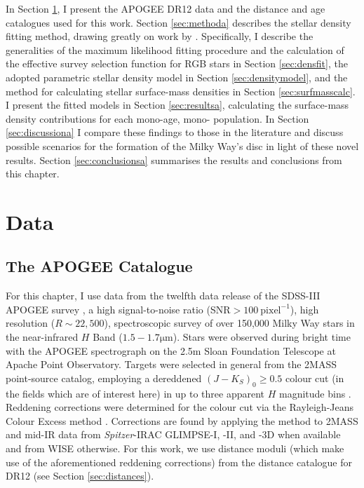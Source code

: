  In Section \ref{sec:dataa}, I present the APOGEE DR12 data and the distance and age catalogues used for this work. Section \ref{sec:methoda} describes the stellar density fitting method, drawing greatly on work by \citet{2016ApJ...818..130B,2016ApJ...823...30B}. Specifically, I describe the generalities of the maximum likelihood fitting procedure and the calculation of the effective survey selection function for RGB stars in Section \ref{sec:densfit}, the adopted parametric stellar density model in Section \ref{sec:densitymodel}, and the method for calculating stellar surface-mass densities in Section \ref{sec:surfmasscalc}. I present the fitted models in Section \ref{sec:resultsa}, calculating the surface-mass density contributions for each mono-age, mono-\feh{} population. In Section \ref{sec:discussiona} I compare these findings to those in the literature and discuss possible scenarios for the formation of the Milky Way's disc in light of these novel results. Section \ref{sec:conclusionsa} summarises the results and conclusions from this chapter. 


 \section{Data}

\label{sec:dataa}
 \subsection{The APOGEE Catalogue}
 \label{sec:APOGEE}
For this chapter, I use data from the twelfth data release \citep[DR12,][]{2015ApJS..219...12A} of the SDSS-III APOGEE survey \citep[][]{2015arXiv150905420M}, a high signal-to-noise ratio (SNR$>100\ \mathrm{pixel}^{-1}$), high resolution ($R \sim 22,500$), spectroscopic survey of over 150,000 Milky Way stars in the near-infrared $H$ Band ($1.5 - 1.7 \mathrm{\mu m}$). Stars were observed during bright time with the APOGEE spectrograph \citep{2010SPIE.7735E..1CW} on the 2.5m Sloan Foundation Telescope \citep{2006AJ....131.2332G} at Apache Point Observatory. Targets were selected in general from the 2MASS point-source catalog, employing a dereddened $(J-K_S)_0 \geq 0.5$ colour cut (in the fields which are of interest here) in up to three apparent $H$ magnitude bins \citep[for a full description of the APOGEE target selection, see][]{2013AJ....146...81Z}. Reddening corrections were determined for the colour cut via the Rayleigh-Jeans Colour Excess method \citep[RJCE,][]{2011ApJ...739...25M}. Corrections are found by applying the method to 2MASS \citep{2006AJ....131.1163S} and mid-IR data from \emph{Spitzer}-IRAC GLIMPSE-I, -II, and -3D \citep{2009PASP..121..213C} when available and from WISE \citep{2010AJ....140.1868W} otherwise. For this work, we use distance moduli (which make use of the aforementioned reddening corrections) from the \citet{2015ApJ...808..132H} distance catalogue for DR12 (see Section \ref{sec:distances}). 

